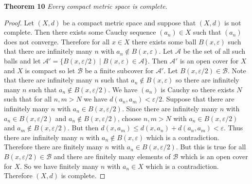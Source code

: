 \documentclass{article}
\begin{document}
\begin{flushleft}
\textbf{Theorem 10}
\textsl{Every compact metric space is complete.}
\begin{proof}
Let $(X,d)$ be a compact metric space and suppose that $(X,d)$ is not complete. Then there exists some Cauchy sequence $(a_n) \in X$ such that $(a_n)$ does not converge. Therefore for all $x \in X$ there exists some ball $B(x,\varepsilon)$ such that there are infinitely many $n$ with $a_n \notin B(x,\varepsilon)$. Let $\mathcal{A}$ be the set of all such balls and let $\mathcal{A}' = \{B(x,\varepsilon/2) \mid B(x, \varepsilon) \in \mathcal{A}\}$. Then $\mathcal{A}'$ is an open cover for $X$ and $X$ is compact so let $\mathcal{B}$ be a finite subcover for $\mathcal{A}'$. Let $B(x,\varepsilon/2) \in \mathcal{B}$. Note that there are infinitely many $n$ such that $a_n \notin B(x,\varepsilon)$ so there are infinitely many $n$ such that $a_n \notin B(x, \varepsilon/2)$. We have $(a_n)$ is Cauchy so there exists $N$ such that for all $n,m > N$ we have $d(a_n,a_m) < \varepsilon/2$. Suppose that there are infinitely many $n$ with $a_n \in B(x, \varepsilon/2)$. Since there are infinitely many $n$ with $a_n \in B(x, \varepsilon/2)$ and $a_n \notin B(x, \varepsilon/2)$, choose $n,m>N$ with $a_n \in B(x, \varepsilon/2)$ and $a_m \notin B(x, \varepsilon/2)$. But then $d(x,a_m) \leq d(x,a_n) + d(a_n,a_m) < \varepsilon$. Thus there are infinitely many $n$ with $a_n \notin B(x,\varepsilon)$ which is a contradiction. Therefore there are finitely many $n$ with $a_n \in B(x,\varepsilon/2)$. But this is true for all $B(x,\varepsilon/2) \in \mathcal{B}$ and there are finitely many elements of $\mathcal{B}$ which is an open cover for $X$. So we have finitely many $n$ with $a_n \in X$ which is a contradiction. Therefore $(X,d)$ is complete.
\end{proof}


\end{flushleft}
\end{document}
